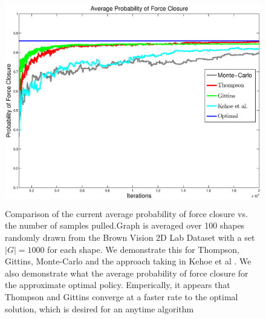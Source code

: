 \documentclass[journal,transmag]{IEEEtran}%
\begin{document}
\begin{figure}[ht!]
\centering
\includegraphics[width = 16.5cm, height = 9cm]{matlab_figures/pfc.eps}
\caption{ \footnotesize Comparison of the current average probability of force closure vs. the number of samples pulled.Graph is averaged over 100 shapes randomly drawn from the Brown Vision 2D Lab Dataset \cite{brown} with a set $|G|=1000$ for each shape.  We demonstrate this for Thompson, Gittins, Monte-Carlo and the approach taking in Kehoe et al \cite{kehoe2012toward}. We also demonstrate what the average probability of force closure for the approximate optimal policy. Emperically, it appears that Thompson and Gittins converge at a faster rate to the optimal solution, which is desired for an anytime algorithm  }
\vspace*{-10pt}
\label{fig:grasp_quality}
\end{figure}
\end{document}

